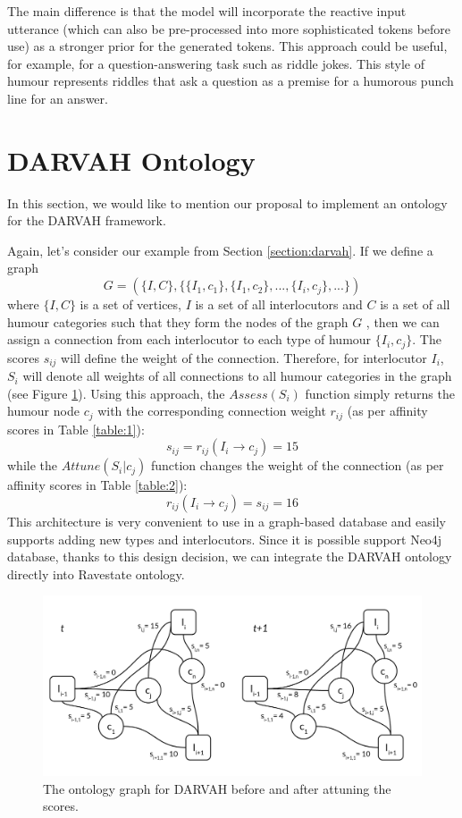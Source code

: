 The main difference is that the model will incorporate the reactive input utterance (which can also be pre-processed into more sophisticated tokens before use) as a stronger prior for the generated tokens. This approach could be useful, for example, for a question-answering task such as riddle jokes. This style of humour represents riddles that ask a question as a premise for a humorous punch line for an answer.

\section{DARVAH Ontology}

In this section, we would like to mention our proposal to implement an ontology for the DARVAH framework.

Again, let's consider our example from Section \ref{section:darvah}. If we define a graph
\[G = (\{I, C\}, \{\{I_1, c_1\}, \{I_1, c_2\}, ..., \{I_i, c_j\},...\})\]
where \(\{I, C\}\) is a set of vertices, \(I\) is a set of all interlocutors and \( C\) is a set of all humour categories such that they form the nodes of the graph \( G\) , then we can assign a connection from each interlocutor to each type of humour \( \{I_i, c_j\}\). The scores \( s_{ij}\) will define the weight of the connection. Therefore, for interlocutor \( I_i\), \( S_i\) will denote all weights of all connections to all humour categories in the graph (see Figure \ref{fig:graph}). Using this approach, the \( Assess(S_i)\) function simply returns the humour node \( c_j\) with the corresponding connection weight \(r_{ij}\) (as per  affinity scores in Table \ref{table:1}):
\[ s_{ij}=r_{ij}(I_i \to c_j)=15\] 
while the \(Attune(S_i|c_j)\) function changes the weight of the connection (as per affinity scores in Table \ref{table:2}):
\[ r_{ij}(I_i \to c_j)=s_{ij}=16\]
This architecture is very convenient to use in a graph-based database and easily supports adding new types and interlocutors. Since it is possible support Neo4j database, thanks to this design decision, we can integrate the DARVAH ontology directly into Ravestate ontology.

\begin{figure}[htpb]
  \centering
  \includegraphics[width=1.0\textwidth]{figures/ontology.png}
  \caption{The ontology graph for DARVAH before and after attuning the scores.} \label{fig:graph}
\end{figure}

